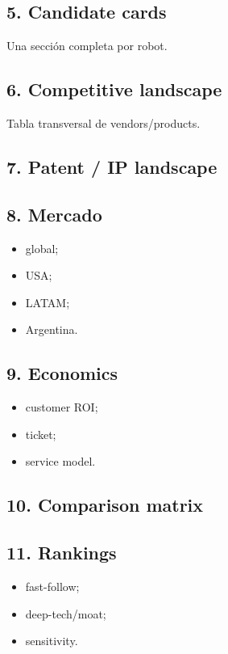 \documentclass[11pt,a4paper]{article}
\begin{document}
\subsection*{5. Candidate cards}
Una sección completa por robot.


\subsection*{6. Competitive landscape}
Tabla transversal de vendors/products.


\subsection*{7. Patent / IP landscape}

\subsection*{8. Mercado}
\begin{itemize}
\item global;
\item USA;
\item LATAM;
\item Argentina.
\end{itemize}


\subsection*{9. Economics}
\begin{itemize}
\item customer ROI;
\item ticket;
\item service model.
\end{itemize}


\subsection*{10. Comparison matrix}

\subsection*{11. Rankings}
\begin{itemize}
\item fast-follow;
\item deep-tech/moat;
\item sensitivity.
\end{itemize}
\end{document}
